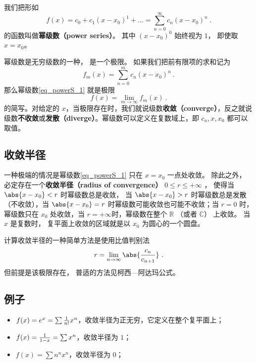 

我们把形如
\begin{equation}\label{eq_powerS_1}
f(x) = c_0 + c_1 (x - x_0)^1 + \dots = \sum_{n=0}^\infty c_n (x-x_0)^n~.
\end{equation}
的函数叫做\textbf{幂级数（power series）}。 其中 $(x - x_0)^0$ 始终视为 $1$， 即使取 $x = x_0$。

幂级数是无穷级数的一种， 是一个极限。 如果我们把前有限项的求和记为
\begin{equation}
f_m(x) = \sum_{n=0}^m c_n (x-x_0)^n~.
\end{equation}
那么幂级数\autoref{eq_powerS_1} 就是极限
\begin{equation}
f(x) = \lim_{m\to\infty} f_m(x)~.
\end{equation}
的简写。对给定的 $x$，当极限存在时，我们就说级数\textbf{收敛（converge）}，反之就说级数\textbf{不收敛}或\textbf{发散（diverge）}。幂级数可以定义在复数域上，即 $c_n, x, x_0$ 都可以取值。

\subsection{收敛半径}
一种极端的情况是幂级数\autoref{eq_powerS_1} 只在 $x = x_0$ 一点处收敛。 除此之外， 必定存在一个\textbf{收敛半径（radius of convergence）} $0 \leq r \leq +\infty$ ， 使得当 $\abs{x-x_0} < r$ 时幂级数总是收敛， 当 $\abs{x-x_0} > r$ 时幂级数总是发散（不收敛），当 $\abs{x - x_0} = r$ 时幂级数可能收敛也可能不收敛；当 $r = 0$ 时，幂级数只在 $x_0$ 处收敛，当 $r = + \infty$时，幂级数在整个 $\mathbb{R}$ （或者 $\mathbb{C}$） 上收敛。 当 $x$ 是复数时， 复平面上收敛的区域就是以 $x_0$ 为圆心的一个圆盘。

计算收敛半径的一种简单方法是使用比值判别法
\begin{equation}
r = \lim_{n \to \infty} \abs{\frac{c_n}{c_{n+1}}}~.
\end{equation}
但前提是该极限存在， 普适的方法见柯西—阿达玛公式。

\subsection{例子}
\begin{example}{}
\begin{itemize}
\item $f(x) = e^x = \sum {1 \over n!} x^n$，收敛半径为正无穷，它定义在整个复平面上；
\item $f(x) = {1 \over 1 - x} = \sum x^n$，收敛半径为 $1$；
\item $f(x) = \sum n^n x^n$，收敛半径为 $0$；
\end{itemize}
\end{example}
